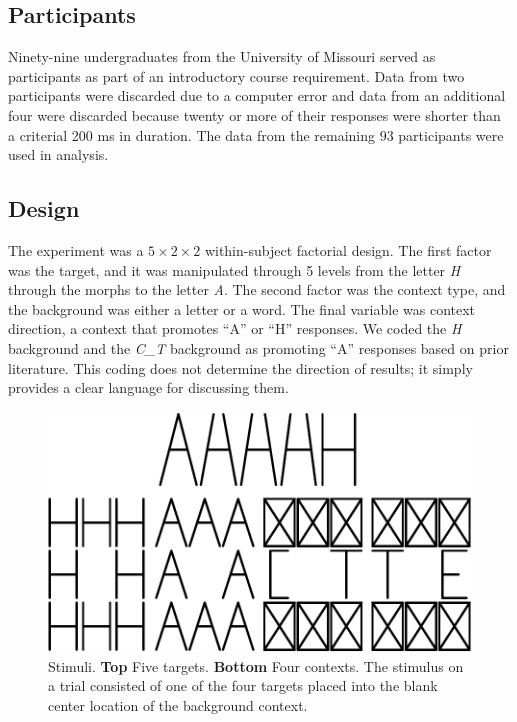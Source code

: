 \documentclass[english,floatsintext,man]{apa6}
\theoremstyle{definition}
\theoremstyle{definition}
\theoremstyle{remark}
\begin{document}
\subsection{Participants}\label{participants}

Ninety-nine undergraduates from the University of Missouri served as
participants as part of an introductory course requirement. Data from
two participants were discarded due to a computer error and data from an
additional four were discarded because twenty or more of their responses
were shorter than a criterial 200 ms in duration. The data from the
remaining \(93\) participants were used in analysis.

\subsection{Design}\label{design}

The experiment was a \(5\times 2 \times 2\) within-subject factorial
design. The first factor was the target, and it was manipulated through
5 levels from the letter \emph{H} through the morphs to the letter
\emph{A}. The second factor was the context type, and the background was
either a letter or a word. The final variable was context direction, a
context that promotes \enquote{A} or \enquote{H} responses. We coded the
\emph{H} background and the \emph{C\_T} background as promoting
\enquote{A} responses based on prior literature. This coding does not
determine the direction of results; it simply provides a clear language
for discussing them.

\begin{figure}[htbp]
\centering
\includegraphics{paper_files/figure-latex/stimulus-1.pdf}
\caption{\label{fig:stimulus}Stimuli. \textbf{Top} Five targets.
\textbf{Bottom} Four contexts. The stimulus on a trial consisted of one
of the four targets placed into the blank center location of the
background context.}
\end{figure}
\end{document}
